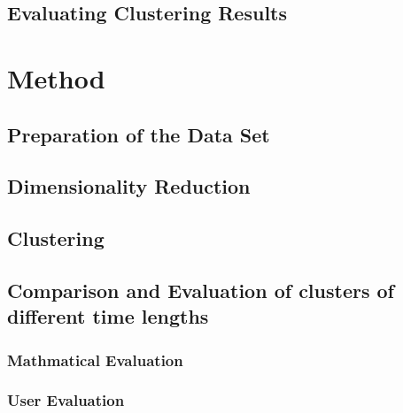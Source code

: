   \subsection{Evaluating Clustering Results}
  \label{section:TheoryEvaluatingClusteringResults}
  


\section{Method}
\label{section:Experiment}


  \subsection{Preparation of the Data Set}
  \label{section:ExperimentPreparationDataSet}
  

  \subsection{Dimensionality Reduction}
  \label{section:DimensionalityReduction}
  

  \subsection{Clustering}
  \label{section:ExperimentClustering}
  

  \subsection{Comparison and Evaluation of clusters of different time lengths}
  \label{section:ExperimentComparisonTimeLengths}
  
  
  \subsubsection{Mathmatical Evaluation}
  
  \subsubsection{User Evaluation}



